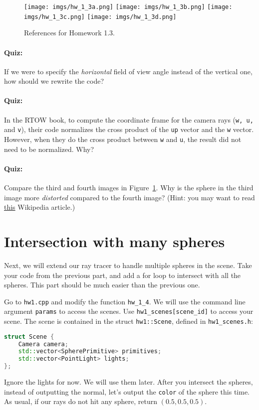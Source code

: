 \begin{figure}[ht]
    \centering
    \texttt{[image: imgs/hw\_1\_3a.png]}
    \texttt{[image: imgs/hw\_1\_3b.png]}
    \texttt{[image: imgs/hw\_1\_3c.png]}
    \texttt{[image: imgs/hw\_1\_3d.png]}
    \caption{References for Homework 1.3.}
    \label{fig:hw_1_3}
\end{figure}

\paragraph{Quiz:} If we were to specify the \emph{horizontal} field of view angle instead of the vertical one, how should we rewrite the code?

\paragraph{Quiz:} In the RTOW book, to compute the coordinate frame for the camera rays (\lstinline{w, u,} and \lstinline{v}), their code normalizes the cross product of the \lstinline{up} vector and the \lstinline{w} vector. However, when they do the cross product between \lstinline{w} and \lstinline{u}, the result did not need to be normalized. Why?

\paragraph{Quiz:} Compare the third and fourth images in Figure~\ref{fig:hw_1_3}. Why is the sphere in the third image more \emph{distorted} compared to the fourth image? (Hint: you may want to read \href{https://en.wikipedia.org/wiki/Perspective_distortion}{this} Wikipedia article.)

\section{Intersection with many spheres}
Next, we will extend our ray tracer to handle multiple spheres in the scene. Take your code from the previous part, and add a for loop to intersect with all the spheres. This part should be much easier than the previous one. 

Go to \lstinline{hw1.cpp} and modify the function \lstinline{hw_1_4}. We will use the command line argument \lstinline{params} to access the scenes. Use \lstinline{hw1_scenes[scene_id]} to access your scene. The scene is contained in the struct \lstinline{hw1::Scene}, defined in \lstinline{hw1_scenes.h}:
\begin{lstlisting}[language=C++]
struct Scene {
    Camera camera;
    std::vector<SpherePrimitive> primitives;
    std::vector<PointLight> lights; 
};
\end{lstlisting}
Ignore the lights for now. We will use them later. 
After you intersect the spheres, instead of outputting the normal, let's output the \lstinline{color} of the sphere this time. As usual, if our rays do not hit any sphere, return $(0.5, 0.5, 0.5)$.

